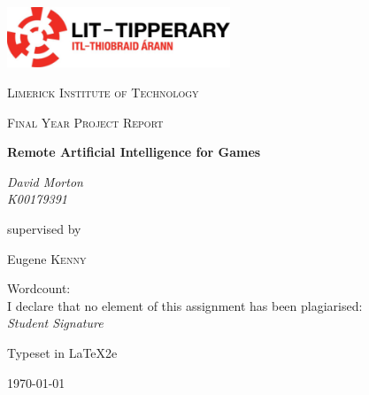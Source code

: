\documentclass[12pt,a4paper]{report}
\begin{document}
\begin{titlepage}
	\centering
	\includegraphics[width=0.5\textwidth]{Figures/lit_logo.jpg}\par\vspace{1cm}
	{\scshape\LARGE Limerick Institute of Technology \par}
	\vspace{1cm}
	{\scshape\Large Final Year Project Report\par}
	\vspace{1.5cm}
	{\huge\bfseries Remote Artificial Intelligence for Games\par}
	\vspace{2cm}
	{\Large\itshape David Morton\\K00179391\par}
	\vfill
	supervised by\par
	Eugene \textsc{Kenny}

	\vfill

Wordcount:\\
\bigskip
I declare that no element of this assignment has been plagiarised:\\
\textit{Student Signature}

\bigskip
\bigskip

Typeset in \LaTeX2e

\bigskip
\bigskip

	{\large \today\par}
\end{titlepage}
\end{document}
